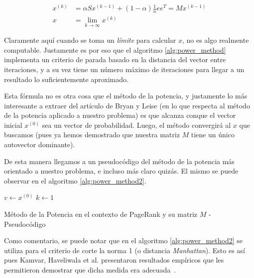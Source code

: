 \begin{align*}
    x^{(k)} &= \alpha Sx^{(k-1)} + (1-\alpha)\frac{1}{n}ee^T = Mx^{(k-1)}\\
    x &= \lim_{k\rightarrow\infty} x^{(k)}
\end{align*}

\par Claramente aqu\'i cuando se toma un \emph{l\'imite} para calcular $x$, no
es algo realmente computable. Justamente es por eso que el algoritmo
\ref{alg:power_method} implementa un criterio de parada basado en la distancia
del vector entre iteraciones, y a su vez tiene un n\'umero m\'aximo de
iteraciones para llegar a un resultado lo suficientemente aproximado.

\par Esta f\'ormula no es otra cosa que el m\'etodo de la potencia, y justamente
lo m\'as interesante a extraer del art\'iculo de Bryan y Leise (en lo que
respecta al m\'etodo de la potencia aplicado a nuestro problema) es que alcanza
conque el vector inicial $x^{(0)}$ sea un vector de probabilidad. Luego, el
m\'etodo convergir\'a al $x$ que buscamos (pues ya hemos demostrado que nuestra
matriz $M$ tiene un \'unico autovector dominante).

\par De esta manera llegamos a un pseudoc\'odigo del m\'etodo de la potencia
m\'as orientado a nuestro problema, e incluso m\'as claro quiz\'as. El mismo se
puede observar en el algoritmo \ref{alg:power_method2}.

\begin{algorithm}
    $v\gets x^{(0)}$\;
    $k\gets 1$\;

    \caption{M\'etodo de la Potencia en el contexto de PageRank y su matriz $M$
    - Pseudoc\'odigo~\cite[p.263]{Kamvar2003}}
    \label{alg:power_method2}
\end{algorithm}

\par Como comentario, se puede notar que en el algoritmo \ref{alg:power_method2} se
utiliza para el criterio de corte la norma 1 (o distancia \emph{Manhattan}).
Esto es as\'i pues Kamvar, Haveliwala et al. presentaron resultados emp\'iricos
que les permitieron demostrar que dicha medida era
adecuada~\cite[p.268]{Kamvar2003}.

